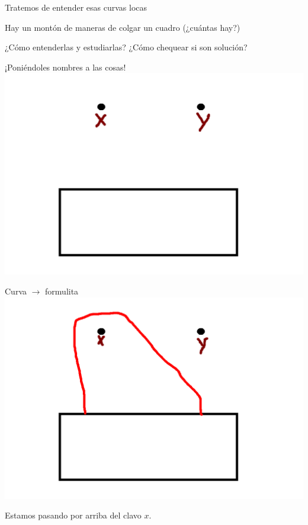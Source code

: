 \documentclass[11pt]{beamer}
\begin{document}
\begin{frame}{Tratemos de entender esas curvas locas}

	Hay un montón de maneras de colgar un cuadro (¿cuántas hay?)
	
	¿Cómo entenderlas y estudiarlas? ¿Cómo chequear si son solución?


	\Large{¡Poniéndoles nombres a las cosas!}
	\includegraphics[scale=0.35]{images/_xy.png}

\end{frame}


\begin{frame}{Curva $\rightarrow$ formulita}
	\includegraphics[scale=0.35]{images/x.png}
	
	
	Estamos pasando por arriba del clavo $x$.


\end{frame}
\end{document}
